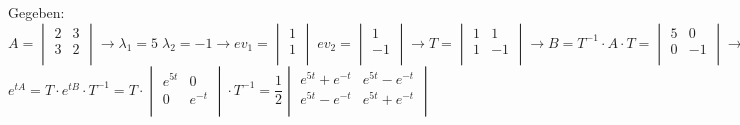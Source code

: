 Gegeben: $A = 	\begin{vmatrix} 
	        		2 & 3\\ 
	        		3 & 2\\   
				\end{vmatrix} \rightarrow
				\lambda_1=5 \; \lambda_2=-1 \rightarrow ev_1=\begin{vmatrix}
					1\\ 
					1\\   
				\end{vmatrix} \;
				ev_2=\begin{vmatrix}
					1\\ 
					-1\\   
				\end{vmatrix} \rightarrow
				T=\begin{vmatrix} 
	        		1 & 1\\ 
	        		1 & -1\\   
				\end{vmatrix} \rightarrow 
				B=T^{-1} \cdot A \cdot T=\begin{vmatrix} 
	        		5 & 0\\ 
	        		0 & -1\\   
				\end{vmatrix} \rightarrow$\\
				\hspace*{4cm}$e^{tA}=T \cdot e^{tB} \cdot T^{-1}=
				T \cdot \begin{vmatrix} 
					e^{5 t} & 0\\ 
					0 & e^{-t}\\   
				\end{vmatrix} \cdot T^{-1} =
				\dfrac{1}{2}\begin{vmatrix} 
					e^{5 t} + e^{-t}& e^{5 t} - e^{-t}\\ 
					e^{5 t} - e^{-t} & e^{5 t} + e^{-t}\\   
				\end{vmatrix}$


